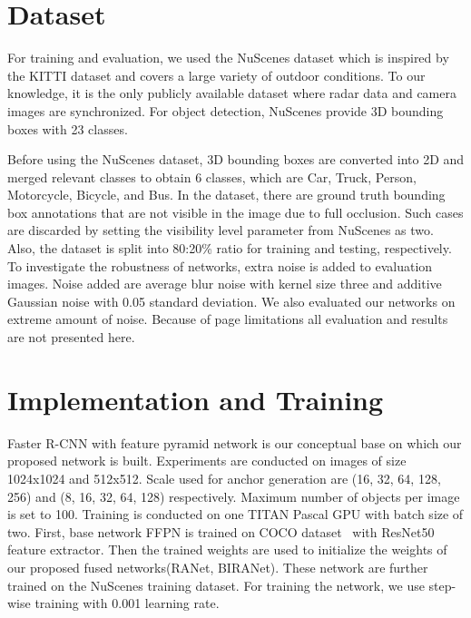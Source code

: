 \documentclass{article}
\begin{document}
\section{Dataset}
\label{sec:Dataset}
For training and evaluation, we used the NuScenes dataset which is inspired by the KITTI dataset and covers a large variety of outdoor conditions. To our knowledge, it is the only publicly available dataset where radar data and camera images are synchronized. For object detection, NuScenes provide 3D bounding boxes with 23 classes.

Before using the NuScenes dataset, 3D bounding boxes are converted into 2D and merged relevant classes to obtain 6 classes, which are Car, Truck, Person, Motorcycle, Bicycle, and Bus. In the dataset, there are ground truth bounding box annotations that are not visible in the image due to full occlusion. Such cases are discarded by setting the visibility level parameter from NuScenes as two. Also, the dataset is split into 80:20\% ratio for training and testing, respectively. To investigate the robustness of networks, extra noise is added to evaluation images. Noise added are average blur noise with kernel size three and additive Gaussian noise with 0.05 standard deviation. We also evaluated our networks on extreme amount of noise. Because of page limitations all evaluation and results are not presented here.

\section{Implementation and Training}
\label{sec:implementation}
Faster R-CNN with feature pyramid network is our conceptual base on which our proposed network is built. Experiments are conducted on images of size 1024x1024 and 512x512. Scale used for anchor generation are (16, 32, 64, 128, 256) and (8, 16, 32, 64, 128) respectively. Maximum number of objects per image is set to 100.
Training is conducted on one TITAN Pascal GPU with batch size of two. First, base network FFPN is trained on COCO dataset~\cite{lin2014microsoft} with ResNet50 feature extractor. Then the trained weights are used to initialize the weights of our proposed fused networks(RANet, BIRANet). These network are further trained on the NuScenes training dataset. For training the network, we use step-wise training with 0.001 learning rate.
\end{document}
